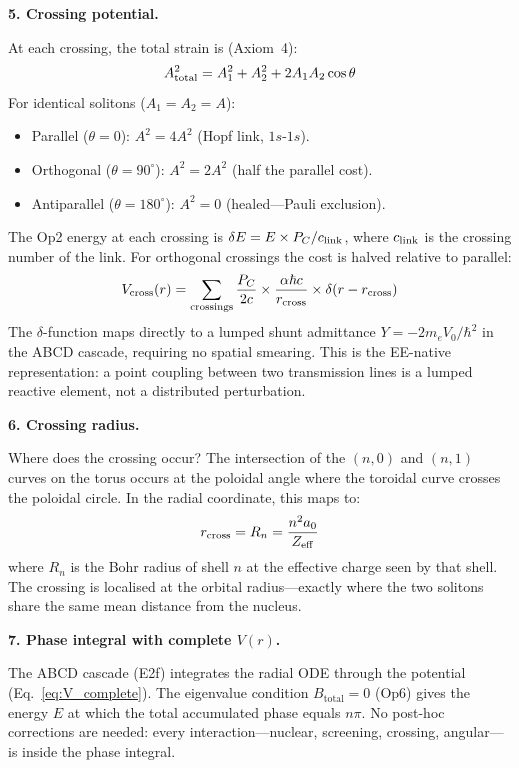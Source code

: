 \noindent\textbf{5. Crossing potential.}

At each crossing, the total strain is
(Axiom~4):
\begin{equation}
    A_{\rm total}^2 = A_1^2 + A_2^2
    + 2 A_1 A_2 \cos\theta
\end{equation}
For identical solitons ($A_1 = A_2 = A$):
\begin{itemize}
    \item Parallel ($\theta = 0$):
          $A^2 = 4A^2$ (Hopf link, $1s$-$1s$).
    \item Orthogonal ($\theta = 90^\circ$):
          $A^2 = 2A^2$ (half the parallel cost).
    \item Antiparallel ($\theta = 180^\circ$):
          $A^2 = 0$ (healed---Pauli exclusion).
\end{itemize}

The Op2 energy at each crossing is
$\delta E = E \times P_C / c_{\rm link}$,
where $c_{\rm link}$ is the crossing number
of the link.  For orthogonal crossings the
cost is halved relative to parallel:
\begin{equation}
    V_{\rm cross}(r) =
    \sum_{\text{crossings}} \frac{P_C}{2c}
    \times \frac{\alpha\hbar c}{r_{\rm cross}}
    \times \delta(r - r_{\rm cross})
    \label{eq:V_crossing}
\end{equation}
The $\delta$-function maps directly to a lumped
shunt admittance $Y = -2m_e V_0/\hbar^2$ in the
ABCD cascade, requiring no spatial smearing.
This is the EE-native representation: a point
coupling between two transmission lines is a
lumped reactive element, not a distributed
perturbation.

\noindent\textbf{6. Crossing radius.}

Where does the crossing occur?  The
intersection of the $(n,0)$ and $(n,1)$
curves on the torus occurs at the poloidal
angle where the toroidal curve crosses the
poloidal circle.  In the radial coordinate,
this maps to:
\begin{equation}
    r_{\rm cross} = R_n
    = \frac{n^2 a_0}{Z_{\rm eff}}
\end{equation}
where $R_n$ is the Bohr radius of shell $n$
at the effective charge seen by that shell.
The crossing is localised at the orbital
radius---exactly where the two solitons
share the same mean distance from the nucleus.

\noindent\textbf{7. Phase integral with complete
$V(r)$.}

The ABCD cascade (E2f) integrates the radial
ODE through the potential
(Eq.~\ref{eq:V_complete}).  The eigenvalue
condition $B_{\text{total}} = 0$ (Op6) gives
the energy $E$ at which the total accumulated
phase equals $n\pi$.  No post-hoc corrections
are needed: every interaction---nuclear,
screening, crossing, angular---is inside
the phase integral.

